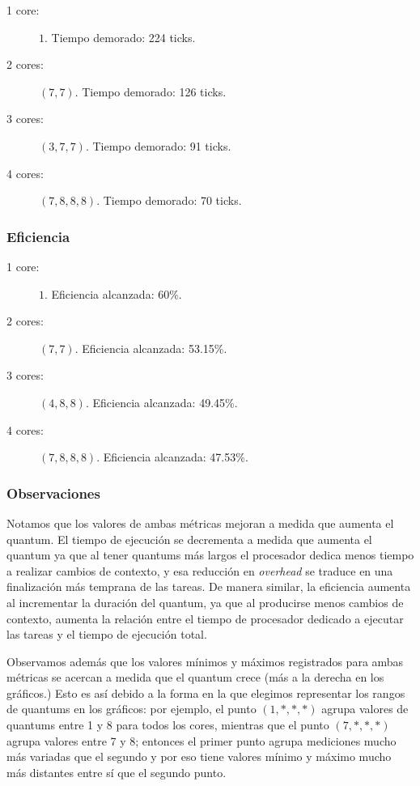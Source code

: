 \documentclass[a4paper,10pt,twoside]{article}
\begin{document}
\begin{description}
	\item[1 core:] $1$.             Tiempo demorado: 224 ticks.
	\item[2 cores:] $(7, 7)$.       Tiempo demorado: 126 ticks.
	\item[3 cores:] $(3, 7, 7)$.    Tiempo demorado: 91 ticks.
	\item[4 cores:] $(7, 8, 8, 8)$. Tiempo demorado: 70 ticks.
\end{description}


\subsubsection{Eficiencia}

\begin{description}
	\item[1 core:] $1$.             Eficiencia alcanzada: 60\%.
	\item[2 cores:] $(7, 7)$.       Eficiencia alcanzada: 53.15\%.
	\item[3 cores:] $(4, 8, 8)$.    Eficiencia alcanzada: 49.45\%.
	\item[4 cores:] $(7, 8, 8, 8)$. Eficiencia alcanzada: 47.53\%.
\end{description}


\subsubsection{Observaciones}

Notamos que los valores de ambas métricas mejoran a medida que aumenta el quantum. El tiempo de ejecución se decrementa a medida que aumenta el quantum ya que al tener quantums más largos el procesador dedica menos tiempo a realizar cambios de contexto, y esa reducción en \textit{overhead} se traduce en una finalización más temprana de las tareas. De manera similar, la eficiencia aumenta al incrementar la duración del quantum, ya que al producirse menos cambios de contexto, aumenta la relación entre el tiempo de procesador dedicado a ejecutar las tareas y el tiempo de ejecución total.

Observamos además que los valores mínimos y máximos registrados para ambas métricas se acercan a medida que el quantum crece (más a la derecha en los gráficos.) Esto es así debido a la forma en la que elegimos representar los rangos de quantums en los gráficos: por ejemplo, el punto $(1, *, *, *)$ agrupa valores de quantums entre 1 y 8 para todos los cores, mientras que el punto $(7, *, *, *)$ agrupa valores entre 7 y 8; entonces el primer punto agrupa mediciones mucho más variadas que el segundo y por eso tiene valores mínimo y máximo mucho más distantes entre sí que el segundo punto.
\end{document}
